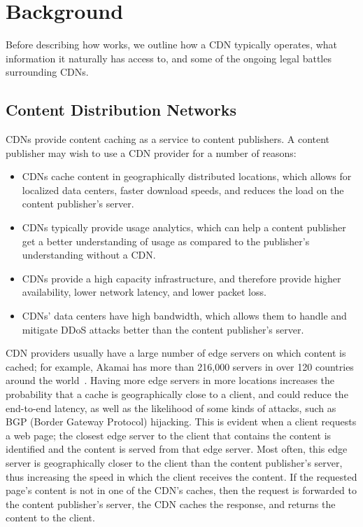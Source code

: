 \section{Background}
\label{sec:background}
Before describing how \system{} works, we outline how a CDN typically operates, what information 
it naturally has access to, and some of the ongoing legal battles surrounding CDNs.  

\subsection{Content Distribution Networks}
CDNs provide content caching as a service to content publishers.  A 
content publisher may wish to use a CDN provider for a number of reasons:

\begin{itemize}
\item CDNs cache content in geographically distributed locations, which allows for localized 
data centers, faster download speeds, and reduces the load on the content publisher's server.
\item CDNs typically provide usage analytics, which can help a content publisher get a better 
understanding of usage as compared to the publisher's understanding without a CDN.
\item CDNs provide a high capacity infrastructure, and therefore provide higher availability, 
lower network latency, and lower packet loss.  
\item CDNs' data centers have high bandwidth, which allows them to handle and mitigate DDoS attacks better 
than the content publisher's server.
\end{itemize}

CDN providers usually have a large number of edge servers on which content is cached; for example, 
Akamai has more than 216,000 servers in over 120 countries around the world~\cite{akamai_facts}.  
Having more edge servers in more locations increases the probability that a cache is geographically 
close to a client, and could reduce the end-to-end latency, as well as the likelihood of some kinds of 
attacks, such as BGP (Border Gateway Protocol) hijacking.  This is evident when a client requests a web page; the closest 
edge server to the client that contains the content is identified and the content is served from that 
edge server.  Most often, this edge server is geographically closer to the client than the content publisher's 
server, thus increasing the speed in which the client receives the content. If the requested page's content is 
not in one of the CDN's caches, then the request is forwarded to the content publisher's server, the CDN 
caches the response, and returns the content to the client. 

